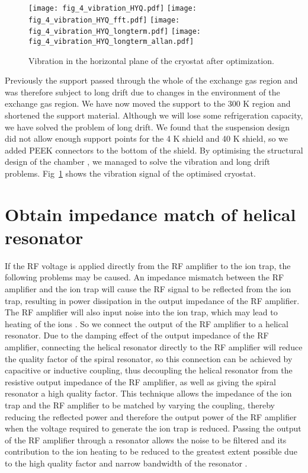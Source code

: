 \begin{figure}
    \centering
    {\texttt{[image: fig\_4\_vibration\_HYQ.pdf]}}
    {\texttt{[image: fig\_4\_vibration\_HYQ\_fft.pdf]}}
    {\texttt{[image: fig\_4\_vibration\_HYQ\_longterm.pdf]}}
    {\texttt{[image: fig\_4\_vibration\_HYQ\_longterm\_allan.pdf]}}
    \caption{Vibration in the horizontal plane of the cryostat after optimization.}
    \label{fig:fig_4_vibration_HYQ}
\end{figure}

Previously the support passed through the whole of the exchange gas region and was therefore subject to long drift due to changes in the environment of the exchange gas region. We have now moved the support to the 300 K region and shortened the support material. Although we will lose some refrigeration capacity, we have solved the problem of long drift. We found that the suspension design did not allow enough support points for the 4 K shield and 40 K shield, so we added PEEK connectors to the bottom of the shield. By optimising the structural design of the chamber \cite{RN261}, we managed to solve the vibration and long drift problems. Fig~\ref{fig:fig_4_vibration_HYQ} shows the vibration signal of the optimised cryostat.



\section {Obtain impedance match of helical resonator}

If the RF voltage is applied directly from the RF amplifier to the ion trap, the following problems may be caused. An impedance mismatch between the RF amplifier and the ion trap will cause the RF signal to be reflected from the ion trap, resulting in power dissipation in the output impedance of the RF amplifier. The RF amplifier will also input noise into the ion trap, which may lead to heating of the ions \cite{RN360,RN162,RN276,RN135}. So we connect the output of the RF amplifier to a helical resonator. Due to the damping effect of the output impedance of the RF amplifier, connecting the helical resonator directly to the RF amplifier will reduce the quality factor of the spiral resonator, so this connection can be achieved by capacitive or inductive coupling, thus decoupling the helical resonator from the resistive output impedance of the RF amplifier, as well as giving the spiral resonator a high quality factor. This technique allows the impedance of the ion trap and the RF amplifier to be matched by varying the coupling, thereby reducing the reflected power and therefore the output power of the RF amplifier when the voltage required to generate the ion trap is reduced. Passing the output of the RF amplifier through a resonator allows the noise to be filtered and its contribution to the ion heating to be reduced to the greatest extent possible due to the high quality factor and narrow bandwidth of the resonator \cite{RN337,RN342,RN340,RN330,RN332}.

